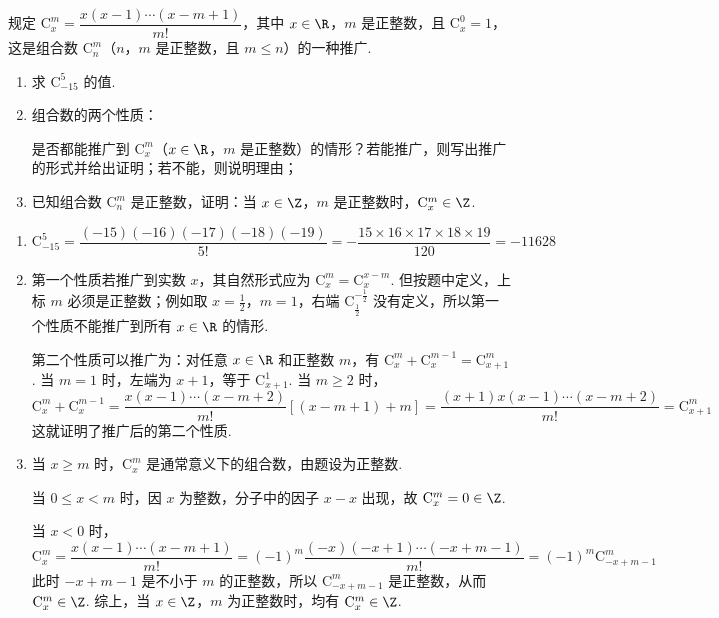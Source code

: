 \begin{problem}
规定 \(\mathrm C_{x}^{m} = \dfrac{x(x - 1)\cdots(x - m + 1)}{m!}\)，其中 \(x \in \R\)，\(m\) 是正整数，且 \(\mathrm C_{x}^{0} = 1\)，这是组合数 \(\mathrm C_{n}^{m}\)（\(n\)，\(m\) 是正整数，且 \(m \leqslant n\)）的一种推广.

\begin{enumerate}
\item 求 \(\mathrm C_{-15}^{5}\) 的值.
\item 组合数的两个性质：


是否都能推广到 \(\mathrm C_{x}^{m}\)（\(x \in \R\)，\(m\) 是正整数）的情形？若能推广，则写出推广的形式并给出证明；若不能，则说明理由；
\item 已知组合数 \(\mathrm C_{n}^{m}\) 是正整数，证明：当 \(x \in \Z\)，\(m\) 是正整数时，\(\mathrm C_{x}^{m} \in \Z\).
\end{enumerate}
\end{problem}

\begin{solution}
\begin{enumerate}
\item
\[
\mathrm C_{-15}^{5}=\frac{(-15)(-16)(-17)(-18)(-19)}{5!}=-\frac{15\times16\times17\times18\times19}{120}=-11628
\]

\item 第一个性质若推广到实数 \(x\)，其自然形式应为 \(\mathrm C_x^m=\mathrm C_x^{x-m}\). 但按题中定义，上标 \(m\) 必须是正整数；例如取 \(x=\frac{1}{2}\)，\(m=1\)，右端 \(\mathrm C_{\frac{1}{2}}^{-\frac{1}{2}}\) 没有定义，所以第一个性质不能推广到所有 \(x\in\R\) 的情形.

第二个性质可以推广为：对任意 \(x\in\R\) 和正整数 \(m\)，有 \(\mathrm C_x^m+\mathrm C_x^{m-1}=\mathrm C_{x+1}^m\).
当 \(m=1\) 时，左端为 \(x+1\)，等于 \(\mathrm C_{x+1}^{1}\). 当 \(m\geqslant2\) 时，
\[
\mathrm C_x^m+\mathrm C_x^{m-1}
=\frac{x(x-1)\cdots(x-m+2)}{m!}\left[(x-m+1)+m\right]
=\frac{(x+1)x(x-1)\cdots(x-m+2)}{m!}
=\mathrm C_{x+1}^m
\]
这就证明了推广后的第二个性质.

\item 当 \(x\geqslant m\) 时，\(\mathrm C_x^m\) 是通常意义下的组合数，由题设为正整数.

当 \(0\leqslant x<m\) 时，因 \(x\) 为整数，分子中的因子 \(x-x\) 出现，故 \(\mathrm C_x^m=0\in\Z\).

当 \(x<0\) 时，
\[
\mathrm C_x^m=\frac{x(x-1)\cdots(x-m+1)}{m!}=(-1)^m\frac{(-x)(-x+1)\cdots(-x+m-1)}{m!}=(-1)^m\mathrm C_{-x+m-1}^m
\]
此时 \(-x+m-1\) 是不小于 \(m\) 的正整数，所以 \(\mathrm C_{-x+m-1}^m\) 是正整数，从而 \(\mathrm C_x^m\in\Z\). 综上，当 \(x\in\Z\)，\(m\) 为正整数时，均有 \(\mathrm C_x^m\in\Z\).
\end{enumerate}
\end{solution}
